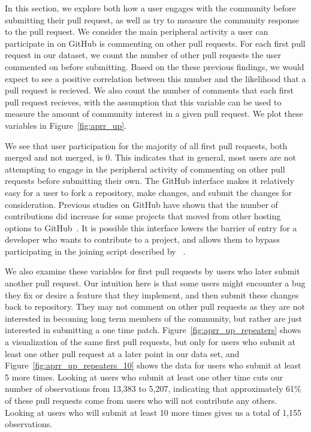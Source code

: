 \documentclass{iitthesis}
\begin{document}
In this section, we explore both how a user engages with the community before
submitting their pull request, as well as try to measure the community response
to the pull request.  We consider the main peripheral activity a user can
participate in on GitHub is commenting on other pull requests. For each first
pull request in our dataset, we count the number of other pull requests the user
commented on before submitting. Based on the these previous findings, we would
expect to see a positive correlation between this number and the likelihood that
a pull request is recieved. We also count the number of comments that each first
pull request recieves, with the assumption that this variable can be used to
measure the amount of community interest in a given pull request. We plot these
variables in Figure~\ref{fig:aprr_up}.

We see that user participation for the majority of all first pull requests, both
merged and not merged, is 0. This indicates that in general, most users are not
attempting to engage in the peripheral activity of commenting on other pull
requests before submitting their own. The GitHub interface makes it relatively
easy for a user to fork a repository, make changes, and submit the changes for
consideration. Previous studies on GitHub have shown that the number of
contributions did increase for some projects that moved from other hosting
options to GitHub~\cite{mcdonald_performance_2013}. It is possible this
interface lowers the barrier of entry for a developer who wants to contribute to
a project, and allows them to bypass participating in the joining script
described by ~\cite{von_krogh_community_2003}.

We also examine these variables for first pull requests by users who later
submit another pull request. Our intuition here is that some users might
encounter a bug they fix or desire a feature that they implement, and then
submit these changes back to repository. They may not comment on other pull
requests as they are not interested in becoming long term members of the
community, but rather are just interested in submitting a one time patch.
Figure~\ref{fig:aprr_up_repeaters} shows a visualization of the same first pull
requests, but only for users who submit at least one other pull request at a
later point in our data set, and Figure~\ref{fig:aprr_up_repeaters_10} shows the
data for users who submit at least 5 more times. Looking at users who submit
at least one other time cuts our number of observations from 13,383 to 5,207,
indicating that approximately 61\% of these pull requests come from users who
will not contribute any others. Looking at users who will submit at least 10
more times gives us a total of 1,155 observations.
\end{document}
